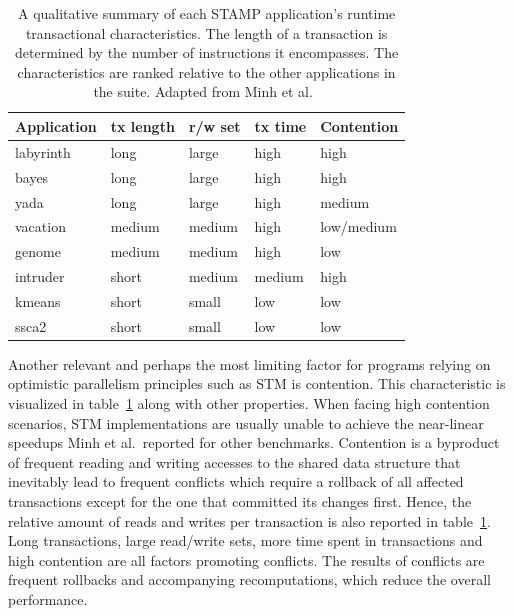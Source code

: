 \begin{table}
    \centering
    \begin{tabular}{|l|l|l|l|l|}
        \hline
        \textbf{Application} & \textbf{tx length} & \textbf{r/w set} & \textbf{tx time} & \textbf{Contention}\\\hline\hline
        labyrinth & long & large & high & high\\\hline
        bayes & long & large & high & high\\\hline
        yada & long & large & high & medium\\\hline
        vacation & medium & medium & high & low/medium\\\hline
        genome & medium & medium & high & low\\\hline
        intruder & short & medium & medium & high\\\hline
        kmeans & short & small & low & low\\\hline
        ssca2 & short & small & low & low\\\hline
    \end{tabular}
    \caption{A qualitative summary of each STAMP application's runtime transactional characteristics. The length of a transaction is determined by the number of instructions it encompasses. The characteristics are ranked relative to the other applications in the suite. Adapted from Minh et al.~\cite{minh2008stamp}}
    \label{tab:experiments:categorization}
\end{table}

Another relevant and perhaps the most limiting factor for programs relying on optimistic parallelism principles such as STM is contention.
This characteristic is visualized in table~\ref{tab:experiments:categorization} along with other properties.
When facing high contention scenarios, STM implementations are usually unable to achieve the near-linear speedups Minh et al.\ reported for other benchmarks.
Contention is a byproduct of frequent reading and writing accesses to the shared data structure that inevitably lead to frequent conflicts which require a rollback of all affected transactions except for the one that committed its changes first.
Hence, the relative amount of reads and writes per transaction is also reported in table~\ref{tab:experiments:categorization}.
Long transactions, large read/write sets, more time spent in transactions and high contention are all factors promoting conflicts.
The results of conflicts are frequent rollbacks and accompanying recomputations, which reduce the overall performance.

